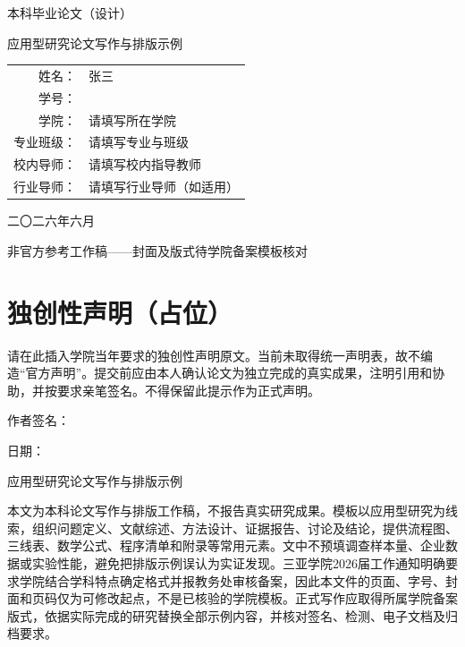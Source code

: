 \documentclass[12pt,a4paper,fontset=none]{ctexart}
\newcommand{\thesistitle}{应用型研究论文写作与排版示例}
\newcommand{\thesisauthor}{张三}
\newcommand{\thesisid}{2022000001}
\newcommand{\thesiscollege}{请填写所在学院}
\newcommand{\thesismajor}{请填写专业与班级}
\newcommand{\thesisadvisor}{请填写校内指导教师}
\newcommand{\thesisindustryadvisor}{请填写行业导师（如适用）}
\begin{document}
\songti{}\setlength{\parindent}{2em}
\begin{titlepage}\thispagestyle{empty}\centering
{}\par\vspace{15mm}
{\heiti{}本科毕业论文（设计）}\par\vspace{15mm}
{\heiti{}\thesistitle}\par\vspace{18mm}
\renewcommand{\arraystretch}{1.8}
\begin{tabular}{r>{\raggedright\arraybackslash}p{.65\linewidth}}
姓名：&\thesisauthor\\学号：&\thesisid\\
学院：&\thesiscollege\\专业班级：&\thesismajor\\
校内导师：&\thesisadvisor\\行业导师：&\thesisindustryadvisor
\end{tabular}\vfill
二〇二六年六月\par\medskip
{\heiti{}非官方参考工作稿——封面及版式待学院备案模板核对}
\end{titlepage}
\pagestyle{empty}\section*{独创性声明（占位）}
请在此插入学院当年要求的独创性声明原文。当前未取得统一声明表，故不编造“官方声明”。提交前应由本人确认论文为独立完成的真实成果，注明引用和协助，并按要求亲笔签名。不得保留此提示作为正式声明。
\vspace{25mm}\begin{flushright}作者签名：\underline{\makebox[30mm]{}}\par\medskip
日期：\underline{\makebox[40mm]{}}\end{flushright}
\clearpage{}\pagestyle{sanya}
\begin{center}{\heiti{}\thesistitle}\par{}\end{center}
本文为本科论文写作与排版工作稿，不报告真实研究成果。模板以应用型研究为线索，组织问题定义、文献综述、方法设计、证据报告、讨论及结论，提供流程图、三线表、数学公式、程序清单和附录等常用元素。文中不预填调查样本量、企业数据或实验性能，避免把排版示例误认为实证发现。三亚学院2026届工作通知明确要求学院结合学科特点确定格式并报教务处审核备案，因此本文件的页面、字号、封面和页码仅为可修改起点，不是已核验的学院模板。正式写作应取得所属学院备案版式，依据实际完成的研究替换全部示例内容，并核对签名、检测、电子文档及归档要求。
\end{document}
